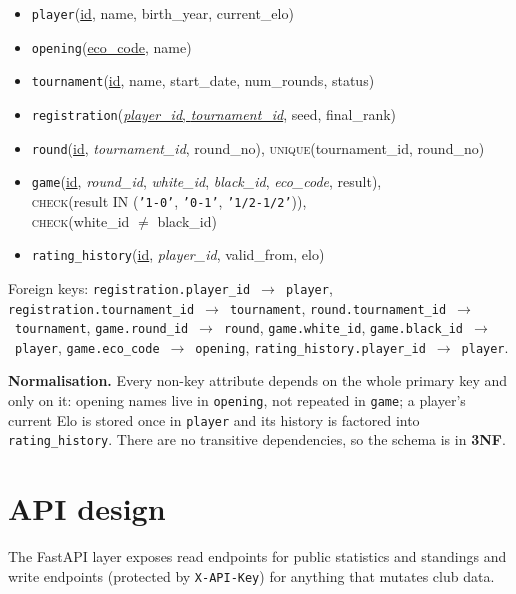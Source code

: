 \documentclass[11pt,a4paper]{article}
\begin{document}
\begin{itemize}
  \item \texttt{player}(\underline{id}, name, birth\_year, current\_elo)
  \item \texttt{opening}(\underline{eco\_code}, name)
  \item \texttt{tournament}(\underline{id}, name, start\_date, num\_rounds, status)
  \item \texttt{registration}(\underline{\emph{player\_id}, \emph{tournament\_id}}, seed, final\_rank)
  \item \texttt{round}(\underline{id}, \emph{tournament\_id}, round\_no),
        \textsc{unique}(tournament\_id, round\_no)
  \item \texttt{game}(\underline{id}, \emph{round\_id}, \emph{white\_id}, \emph{black\_id},
        \emph{eco\_code}, result), \\
        \hspace*{1em}\textsc{check}(result IN (\texttt{'1-0'}, \texttt{'0-1'}, \texttt{'1/2-1/2'})), \\
        \hspace*{1em}\textsc{check}(white\_id $\neq$ black\_id)
  \item \texttt{rating\_history}(\underline{id}, \emph{player\_id}, valid\_from, elo)
\end{itemize}

Foreign keys: \texttt{registration.player\_id}~$\to$~\texttt{player},
\texttt{registration.tournament\_id}~$\to$~\texttt{tournament},
\texttt{round.tournament\_id}~$\to$~\texttt{tournament},
\texttt{game.round\_id}~$\to$~\texttt{round},
\texttt{game.white\_id}, \texttt{game.black\_id}~$\to$~\texttt{player},
\texttt{game.eco\_code}~$\to$~\texttt{opening},
\texttt{rating\_history.player\_id}~$\to$~\texttt{player}.

\textbf{Normalisation.} Every non-key attribute depends on the whole primary key
and only on it: opening names live in \texttt{opening}, not repeated in
\texttt{game}; a player's current Elo is stored once in \texttt{player} and its
history is factored into \texttt{rating\_history}. There are no transitive
dependencies, so the schema is in \textbf{3NF}.

\section{API design}
The FastAPI layer exposes read endpoints for public statistics and standings and
write endpoints (protected by \texttt{X-API-Key}) for anything that mutates
club data.
\end{document}
